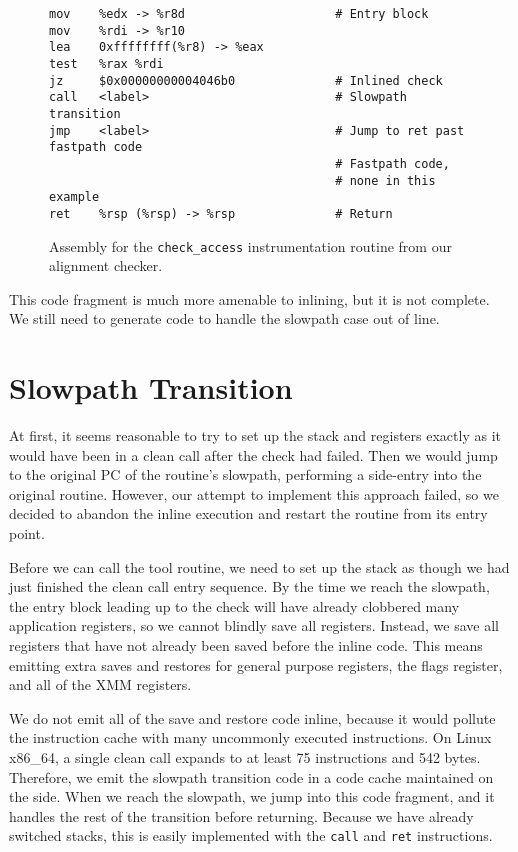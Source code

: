 \begin{figure}
\begin{verbatim}
mov    %edx -> %r8d                     # Entry block
mov    %rdi -> %r10
lea    0xffffffff(%r8) -> %eax
test   %rax %rdi
jz     $0x00000000004046b0              # Inlined check
call   <label>                          # Slowpath transition
jmp    <label>                          # Jump to ret past fastpath code
                                        # Fastpath code,
                                        # none in this example
ret    %rsp (%rsp) -> %rsp              # Return
\end{verbatim}
\caption{Assembly for the {\tt check\_access} instrumentation routine from our
alignment checker.}
\label{fig:alignment_fastpath}
\end{figure}

This code fragment is much more amenable to inlining, but it is not complete.
We still need to generate code to handle the slowpath case out of line.

\section{Slowpath Transition}

At first, it seems reasonable to try to set up the stack and registers exactly
as it would have been in a clean call after the check had failed.  Then we would
jump to the original PC of the routine's slowpath, performing a side-entry into
the original routine.  However, our attempt to implement this approach failed,
so we decided to abandon the inline execution and restart the routine from its
entry point.

Before we can call the tool routine, we need to set up the stack as though we
had just finished the clean call entry sequence.  By the time we reach the
slowpath, the entry block leading up to the check will have already clobbered
many application registers, so we cannot blindly save all registers.  Instead,
we save all registers that have not already been saved before the inline code.
This means emitting extra saves and restores for general purpose registers, the
flags register, and all of the XMM registers.

We do not emit all of the save and restore code inline, because it would pollute
the instruction cache with many uncommonly executed instructions.  On Linux
x86\_64, a single clean call expands to at least 75 instructions and 542 bytes.
Therefore, we emit the slowpath transition code in a code cache maintained on
the side.  When we reach the slowpath, we jump into this code fragment, and it
handles the rest of the transition before returning.  Because we have already
switched stacks, this is easily implemented with the {\tt call} and {\tt ret}
instructions.

